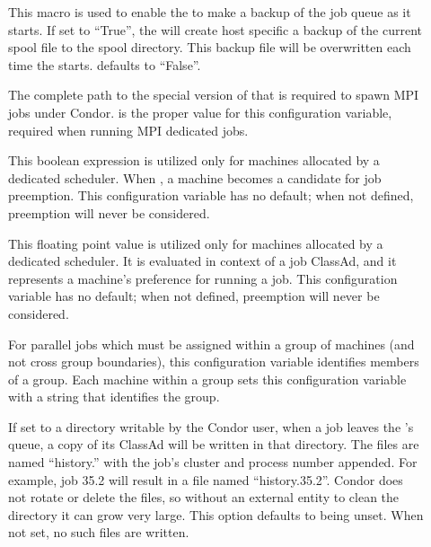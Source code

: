 \begin{description}
\item[]
  \label{param:ScheddBackupSpool} This macro is used to enable the
   to make a backup of the job queue as it starts.  If
  set to ``True'', the  will create host specific a
  backup of the current spool file to the spool directory.  This
  backup file will be overwritten each time the 
  starts.   defaults to ``False''.

\item[]
  \label{param:MPICondorRshPath} The complete path to the
  special version of  that is required to spawn MPI
  jobs under Condor.
   is the proper value for this 
  configuration variable, required when running MPI dedicated jobs.

\item[]
  \label{param:ScheddPreemptionRequirements}
  This boolean expression is
  utilized only for machines allocated by a dedicated scheduler.
  When , a machine becomes a candidate for job preemption.
  This configuration variable has no default;
  when not defined, preemption will never be considered.

\item[]
  \label{param:ScheddPreemptionRank}
  This floating point value is
  utilized only for machines allocated by a dedicated scheduler.
  It is evaluated in context of a job ClassAd,
  and it represents a machine's preference for running a job.
  This configuration variable has no default;
  when not defined, preemption will never be considered.

\item[]
  \label{param:ParallelSchedulingGroup}
  For parallel jobs which must be assigned within a group
  of machines (and not cross group boundaries),
  this configuration variable identifies members of a group. 
  Each machine within a group sets this configuration variable with 
  a string that identifies the group.

\item[]
  \label{param:PerJobHistoryDir}
  If set to a directory writable by the Condor user, when a job
  leaves the 's queue, a copy of its ClassAd will
  be written in that directory.  The files are named ``history.''
  with the job's cluster and process number appended.  For
  example, job 35.2 will result in a file named ``history.35.2''.
  Condor does not rotate or delete the files, so without an
  external entity to clean the directory it can grow very large.
  This option defaults to being unset.  When not set, no such
  files are written.


\end{description}
